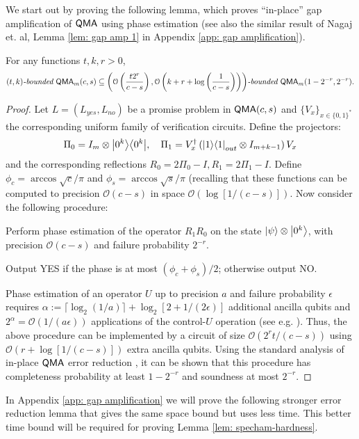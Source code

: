 \documentclass[a4paper,UKenglish]{lipics-v2016}
\newcommand\QMA{{\sf{QMA}}}
\newcommand\bddQMA[5]{{\left(#1,#2\right)}\textit{-bounded }\QMA_{#3}(#4,#5)}
\newcommand\bigoh{\mathcal{O}}
\begin{document}
We start out by proving the following lemma, which proves ``in-place'' gap amplification of $\QMA$ using phase estimation (see also the similar result of Nagaj et. al, Lemma \ref{lem: gap amp 1} in Appendix \ref{app: gap amplification}).
\begin{lemma} \label{lem: gap amp 2}
For any functions $t,k,r>0$, 
\[
\bddQMA{t}{k}{m}{c}{s}\subseteq\bddQMA{\mathcal{O}\left(\frac{t2^r}{c-s}\right)}{\mathcal{O}\left(k+r+\log\left(\frac{1}{c-s}\right)\right)}{m}{1-2^{-r}}{2^{-r}}.
\]
\end{lemma}
\begin{proof}
	Let $L=(L_{yes}, L_{no})$ be a promise problem in $\QMA(c,s)$ and $\{V_x\}_{x\in\{0,1\}^*}$ the corresponding uniform family of verification circuits.
Define the projectors:
\begin{equation}
\Pi_0 = I_m \otimes {\left\vert{0^k}\right\rangle}{\left\langle{0^k}\right\vert}, \quad \Pi_1 = V^\dagger_x \left({\left\vert{1}\right\rangle}{\left\langle{1}\right\vert}_{out} \otimes I_{m+k-1}\right) V_x
\end{equation}
and the corresponding reflections
$R_0 = 2\Pi_0 - I, R_1 = 2\Pi_1 - I$.
Define $\phi_c = \arccos\sqrt{c}/\pi$ and $\phi_s = \arccos\sqrt{s}/\pi$ (recalling that these functions can be computed to precision $\bigoh (c-s)$ in space $\bigoh (\log[1/(c-s)])$. 
Now consider the following procedure:
\begin{compactenum}
\item Perform phase estimation of the operator $R_1R_0$ on the state ${\left\vert{\psi}\right\rangle}\otimes {\left\vert{0^k}\right\rangle}$, with precision $\bigoh (c-s)$ and failure probability $2^{-r}$.
\item Output YES if the phase is at most $(\phi_{c}+\phi_{s})/2$; otherwise output NO.
\end{compactenum}
Phase estimation of an operator $U$ up to precision $a$ and failure probability $\epsilon$ requires $\alpha := \lceil\log_2(1/a)\rceil + \log_2[2+1/(2\epsilon)]$ additional ancilla qubits and $2^\alpha = \mathcal{O}(1/(a\epsilon))$ applications of the control-$U$ operation (see e.g. \cite{nc00}).  Thus, the above procedure can be implemented by a circuit of size $\mathcal{O}(2^{r}t/(c-s))$ using $\mathcal{O}(r+\log[1/(c-s)])$ extra ancilla qubits. Using the standard analysis of in-place $\QMA$ error reduction \cite{mw05,nwz11}, it can be shown that this procedure has completeness probability at least $1-2^{-r}$ and soundness at most $2^{-r}$.
\end{proof}

In Appendix \ref{app: gap amplification} we will prove the following stronger error reduction lemma that gives the same space bound but uses less time. This better time bound will be required for proving Lemma \ref{lem: specham-hardness}.
\end{document}
